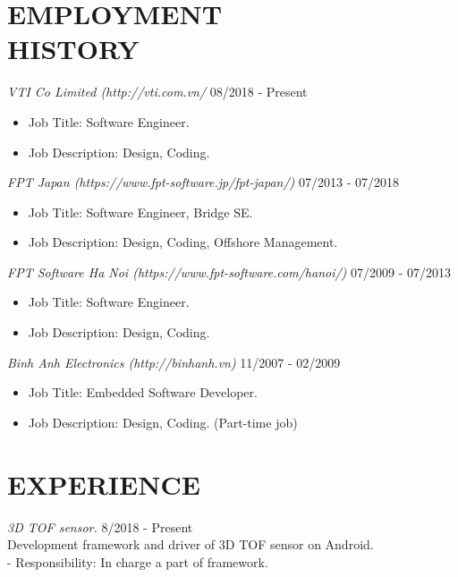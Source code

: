 \documentclass[margin]{res}
\begin{document}
\begin{resume}
 
\section{EMPLOYMENT \\ HISTORY}
		{\sl VTI Co Limited (http://vti.com.vn/}  \hfill 08/2018 - Present
                 \begin{itemize}  \itemsep -2pt  %
                 \item Job Title: Software Engineer.
		 \item Job Description:  Design, Coding. 
                 \end{itemize}

		{\sl FPT Japan (https://www.fpt-software.jp/fpt-japan/)}  \hfill 07/2013 - 07/2018
                 \begin{itemize}  \itemsep -2pt  %
                 \item Job Title: Software Engineer, Bridge SE.
		 \item Job Description:  Design, Coding, Offshore Management. 
                 \end{itemize}

		 {\sl FPT Software Ha Noi (https://www.fpt-software.com/hanoi/)}  \hfill 07/2009 - 07/2013
                 \begin{itemize}  \itemsep -2pt  %
                 \item Job Title: Software Engineer.
		 \item Job Description: Design, Coding.
                 \end{itemize}

		 {\sl Binh Anh Electronics (http://binhanh.vn)}   \hfill 11/2007 - 02/2009
                 \begin{itemize}  \itemsep -2pt  %
		 \item Job Title: Embedded Software Developer. 
		 \item Job Description: Design, Coding. (Part-time job)
                 \end{itemize}
        
\section{EXPERIENCE}
                {\sl 3D TOF sensor.} \hfill            8/2018 - Present \\
		 Development framework and driver of 3D TOF sensor on Android.\\
		 - Responsibility: In charge a part of framework.



\end{resume}
\end{document}
